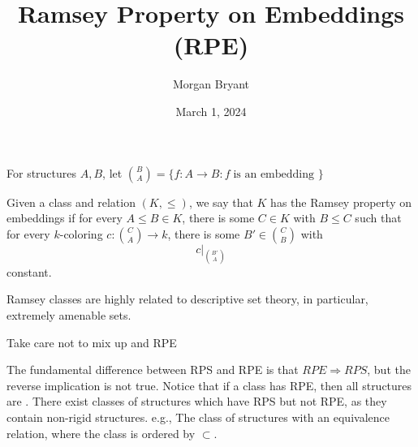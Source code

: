 \documentclass[a4paper]{article}
\title{Ramsey Property on Embeddings (RPE)}
\date{March 1, 2024}
\author{Morgan Bryant}
\begin{document}
\maketitle
\par{For structures \(A,B\), let \(\binom {B}{A} =  \{ f:A \rightarrow  B : f  \;   \text {is an embedding } \}\)}\par{Given a class and relation \((K, \leq )\), we say that \(K\) has the Ramsey property on embeddings if for every \(A \leq  B  \in  K\), there is some \(C \in  K\) with \(B \leq  C\)
such that for every \(k\)-coloring \(c:  \binom {C}{A} \rightarrow  k\), there is some \(B'  \in   \binom {C}{B}\) with \[c|_{ \binom {B'}{A}}\] constant.}\par{Ramsey classes are highly related to descriptive set theory, in particular, extremely amenable sets.}\par{Take care not to mix up  and RPE}\par{The fundamental difference between RPS and RPE is that \(RPE  \Rightarrow  RPS\), but the reverse implication is not true. Notice that if 
a class has RPE, then all structures are . There exist classes of structures which have RPS but not RPE, as they contain non-rigid structures. 
e.g., The class of structures with an equivalence relation, where the class is ordered by \(\subset\).}
\printbibliography
\end{document}
